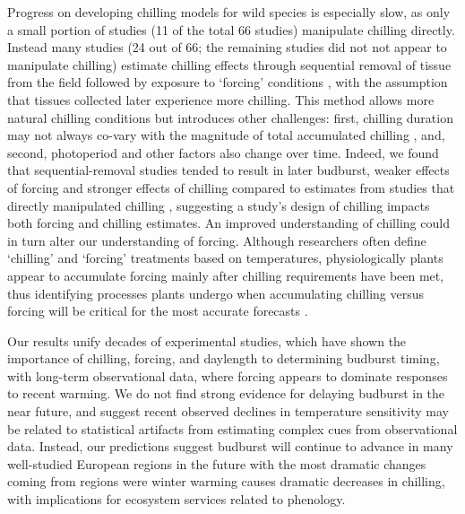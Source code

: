 \documentclass{article}
\begin{document}
\par Progress on developing chilling models for wild species is especially slow, as only a small portion of studies (11 of the total 66 studies) manipulate chilling directly. Instead many studies (24 out of 66; the remaining studies did not not appear to manipulate chilling) estimate chilling effects through sequential removal of tissue from the field followed by exposure to `forcing' conditions \citep{weinberger1950}, with the assumption that tissues collected later experience more chilling. This method allows more natural chilling conditions but introduces other challenges: first, chilling duration may not always co-vary with the magnitude of total accumulated chilling \citep{dennis2003}, and, second, photoperiod and other factors also change over time. Indeed, we found that sequential-removal studies tended to result in later budburst, weaker effects of forcing and stronger effects of chilling compared to estimates from studies that directly manipulated chilling \citep[Fig. 4S][]{weinberger1950,polgar2013}, suggesting a study's design of chilling impacts both forcing and chilling estimates. An improved understanding of chilling could in turn alter our understanding of forcing. Although researchers often define `chilling' and `forcing' treatments based on temperatures, physiologically plants appear to accumulate forcing mainly after chilling requirements have been met,  thus identifying processes plants undergo when accumulating chilling versus forcing will be critical for the most accurate forecasts \citep{chuine2016}.
 \par Our results unify decades of experimental studies, which have shown the importance of chilling, forcing, and daylength to determining budburst timing, with long-term observational data, where forcing appears to dominate responses to recent warming. We do not find strong evidence for delaying budburst in the near future, and suggest recent observed declines in temperature sensitivity may be related to statistical artifacts from estimating complex cues from observational data. Instead, our predictions suggest budburst will continue to advance in many well-studied European regions in the future with the most dramatic changes coming from regions were winter warming causes dramatic decreases in chilling, with implications for ecosystem services related to phenology. %
 
\end{document}
